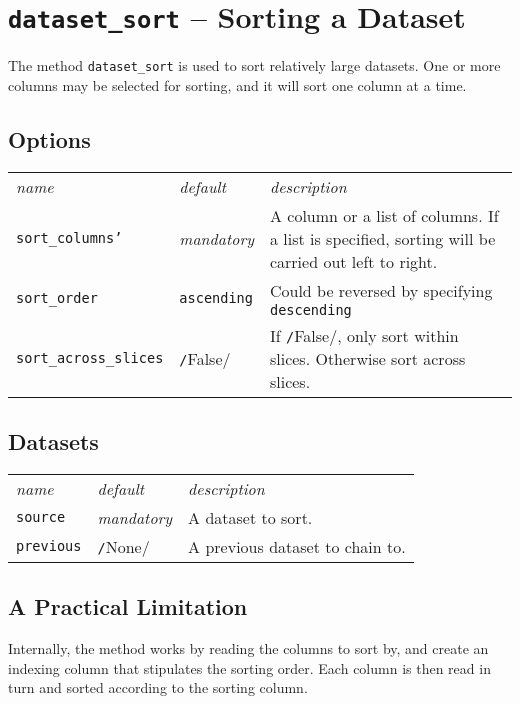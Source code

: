 \clearpage
\section{\texttt{dataset\_sort} -- Sorting a Dataset}
The method \texttt{dataset\_sort} is used to sort relatively large
datasets.  One or more columns may be selected for sorting, and it
will sort one column at a time.

\subsection*{Options}
\begin{tabular}{ p{3.2cm} p{1.8cm} p{10cm}}\hline
  \textsl{name} & \textsl{default} & \textsl{description}\\[2ex]

  \texttt{sort\_columns'} & \textsl{mandatory} & A column or a list of
  columns.  If a list is specified, sorting will be carried out left
  to right.\\[1ex]

  \texttt{sort\_order} & \texttt{ascending} & Could be reversed by
  specifying \texttt{descending}\\[1ex]
  
  \texttt{sort\_across\_slices} & \texttt/False/& If
  \texttt/False/, only sort within slices.  Otherwise sort
  across slices.\\[1ex]
  \hline
\end{tabular}




\subsection*{Datasets}
\begin{tabular}{ p{3.2cm} p{1.8cm} p{10cm}}\hline
  \textsl{name} & \textsl{default} & \textsl{description}\\[2ex]
  \texttt{source} & \textsl{mandatory}& A dataset to sort.\\[1ex]
  \texttt{previous} & \texttt/None/ & A previous dataset to chain to.\\[1ex]
  \hline
\end{tabular}

\subsection{A Practical Limitation}
Internally, the method works by reading the columns to sort by, and
create an indexing column that stipulates the sorting order.  Each
column is then read in turn and sorted according to the sorting
column.

